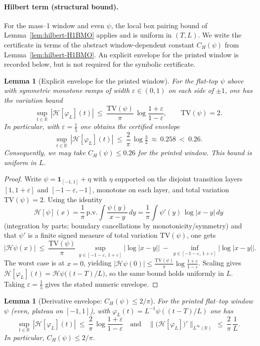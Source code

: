 \documentclass[11pt]{article}
\newtheorem{lemma}[theorem]{Lemma}
\theoremstyle{definition}
\theoremstyle{remark}
\theoremstyle{definition}
\newcommand{\R}{\mathbb{R}}
\begin{document}
\paragraph{Hilbert term (structural bound).}
For the mass--1 window and even \(\psi\), the local box pairing bound of Lemma~\ref{lem:hilbert-H1BMO} applies and is uniform in \((T,L)\). We write the certificate in terms of the abstract window-dependent constant \(C_H(\psi)\) from Lemma~\ref{lem:hilbert-H1BMO}. An explicit envelope for the printed window is recorded below, but is not required for the symbolic certificate.
\begin{lemma}[Explicit envelope for the printed window]\label{lem:CH-explicit}
For the flat-top \(\psi\) above with symmetric monotone ramps of width \(\varepsilon\in(0,1)\) on each side of \(\pm1\), one has the variation bound
\[
  \sup_{t\in\R}\,|\mathcal H[\varphi_L](t)|\ \le\ \frac{\mathrm{TV}(\psi)}{\pi}\,\log\frac{1+\varepsilon}{1-\varepsilon},\qquad \mathrm{TV}(\psi)=2.
\]
In particular, with \(\varepsilon=\tfrac15\) one obtains the certified envelope
\[
  \sup_{t\in\R}\,|\mathcal H[\varphi_L](t)|\ \le\ \frac{2}{\pi}\,\log\tfrac{3}{2}\ \approx\ 0.258\ <\ 0.26.
\]
Consequently, we may take \(C_H(\psi)\le 0.26\) for the printed window. This bound is uniform in \(L\).
\end{lemma}
\begin{proof}
Write \(\psi=\mathbf 1_{[-1,1]}+\eta\) with \(\eta\) supported on the disjoint transition layers \([1,1+\varepsilon]\) and \([-1-\varepsilon,-1]\), monotone on each layer, and total variation \(\mathrm{TV}(\psi)=2\). Using the identity
\[
\mathcal H[\psi](x)=\frac{1}{\pi}\,\mathrm{p.v.}\int \frac{\psi(y)}{x-y}\,dy=\frac{1}{\pi}\int \psi'(y)\,\log|x-y|\,dy
\]
(integration by parts; boundary cancellations by monotonicity/symmetry) and that \(\psi'\) is a finite signed measure of total variation \(\mathrm{TV}(\psi)\), one gets
\[
  |\mathcal H\psi(x)|\ \le\ \frac{\mathrm{TV}(\psi)}{\pi}\,\sup_{y\in[-1-\varepsilon,\,1+\varepsilon]}\big|\log|x-y|\big|\ -\ \inf_{y\in[-1-\varepsilon,\,1+\varepsilon]}\big|\log|x-y|\big|.
\]
The worst case is at \(x=0\), yielding \(|\mathcal H\psi(0)|\le \tfrac{\mathrm{TV}(\psi)}{\pi}\log\tfrac{1+\varepsilon}{1-\varepsilon}\). Scaling gives \(\mathcal H[\varphi_L](t)=\mathcal H\psi\big((t-T)/L\big)\), so the same bound holds uniformly in \(L\). Taking \(\varepsilon=\tfrac15\) gives the stated numeric envelope.
\end{proof}
\begin{lemma}[Derivative envelope: $C_H(\psi)\le 2/\pi$]\label{lem:CH-derivative-2pi}
For the printed flat–top window \(\psi\) (even, plateau on $[-1,1]$), with \(\varphi_L(t)=L^{-1}\psi((t-T)/L)\) one has
\[ \sup_{t\in\R}\,|\mathcal H[\varphi_L](t)|\ \le\ \frac{2}{\pi}\,\log\frac{1+\varepsilon}{1-\varepsilon}\quad\text{and}\quad \big\|\big(\mathcal H[\varphi_L]\big)'\big\|_{L^\infty(\R)}\ \le\ \frac{2}{\pi}\,\frac{1}{L}. \]
In particular, $C_H(\psi)\le 2/\pi$.
\end{lemma}
\end{document}
